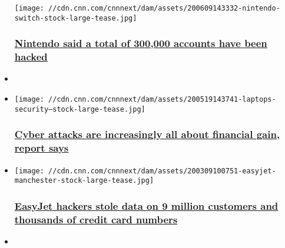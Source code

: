 \begin{itemize}
  \texttt{[image: //cdn.cnn.com/cnnnext/dam/assets/200609143332-nintendo-switch-stock-large-tease.jpg]}

  \hypertarget{nintendo-said-a-total-of-300000-accounts-have-been-hacked}{%
  \subsubsection{\texorpdfstring{\href{/2020/06/09/tech/nintendo-300000-accounts-hacked/index.html}{Nintendo
  said a total of 300,000 accounts have been
  hacked}}{Nintendo said a total of 300,000 accounts have been hacked}}\label{nintendo-said-a-total-of-300000-accounts-have-been-hacked}}
\item
\end{itemize}

\begin{itemize}
\item
  \href{/2020/05/19/tech/data-breach-report-verizon/index.html}{}

  \texttt{[image: //cdn.cnn.com/cnnnext/dam/assets/200519143741-laptops-security---stock-large-tease.jpg]}

  \hypertarget{cyber-attacks-are-increasingly-all-about-financial-gain-report-says}{%
  \subsubsection{\texorpdfstring{\href{/2020/05/19/tech/data-breach-report-verizon/index.html}{Cyber
  attacks are increasingly all about financial gain, report
  says}}{Cyber attacks are increasingly all about financial gain, report says}}\label{cyber-attacks-are-increasingly-all-about-financial-gain-report-says}}
\item
  \href{/2020/05/19/business/easyjet-hack/index.html}{}

  \texttt{[image: //cdn.cnn.com/cnnnext/dam/assets/200309100751-easyjet-manchester-stock-large-tease.jpg]}

  \hypertarget{easyjet-hackers-stole-data-on-9-million-customers-and-thousands-of-credit-card-numbers}{%
  \subsubsection{\texorpdfstring{\href{/2020/05/19/business/easyjet-hack/index.html}{EasyJet
  hackers stole data on 9 million customers and thousands of credit card
  numbers}}{EasyJet hackers stole data on 9 million customers and thousands of credit card numbers}}\label{easyjet-hackers-stole-data-on-9-million-customers-and-thousands-of-credit-card-numbers}}
\item
  \href{/2020/05/18/tech/car-data-safety/index.html}{}


\end{itemize}
